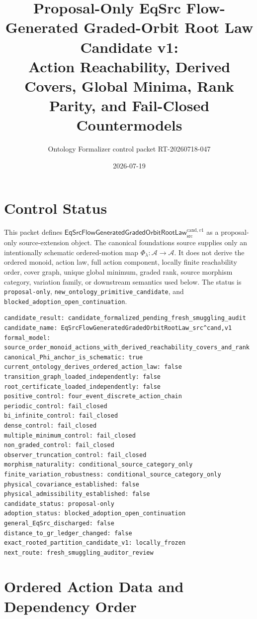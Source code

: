 \documentclass[11pt]{article}
\title{Proposal-Only EqSrc Flow-Generated Graded-Orbit Root Law Candidate v1:\\
Action Reachability, Derived Covers, Global Minima, Rank Parity, and Fail-Closed Countermodels}
\author{Ontology Formalizer control packet RT-20260718-047}
\date{2026-07-19}
\newcommand{\FlowRootLaw}{\mathsf{EqSrcFlowGeneratedGradedOrbitRootLaw}^{\mathrm{cand},v1}_{\mathrm{src}}}
\begin{document}
\maketitle

\section{Control Status}

This packet defines \(\FlowRootLaw\) as a proposal-only source-extension
object. The canonical foundations source supplies only an intentionally
schematic ordered-motion map \(\Phi_\lambda:\mathcal A\to\mathcal A\).
It does not derive the ordered monoid, action law, full action component,
locally finite reachability order, cover graph, unique global minimum, graded
rank, source morphism category, variation family, or downstream semantics
used below. The status is \texttt{proposal-only},
\texttt{new\_ontology\_primitive\_candidate}, and
\texttt{blocked\_adoption\_open\_continuation}.

\begin{verbatim}
candidate_result: candidate_formalized_pending_fresh_smuggling_audit
candidate_name: EqSrcFlowGeneratedGradedOrbitRootLaw_src^cand,v1
formal_model: source_order_monoid_actions_with_derived_reachability_covers_and_rank
canonical_Phi_anchor_is_schematic: true
current_ontology_derives_ordered_action_law: false
transition_graph_loaded_independently: false
root_certificate_loaded_independently: false
positive_control: four_event_discrete_action_chain
periodic_control: fail_closed
bi_infinite_control: fail_closed
dense_control: fail_closed
multiple_minimum_control: fail_closed
non_graded_control: fail_closed
observer_truncation_control: fail_closed
morphism_naturality: conditional_source_category_only
finite_variation_robustness: conditional_source_category_only
physical_covariance_established: false
physical_admissibility_established: false
candidate_status: proposal-only
adoption_status: blocked_adoption_open_continuation
general_EqSrc_discharged: false
distance_to_gr_ledger_changed: false
exact_rooted_partition_candidate_v1: locally_frozen
next_route: fresh_smuggling_auditor_review
\end{verbatim}

\section{Ordered Action Data and Dependency Order}
\end{document}
